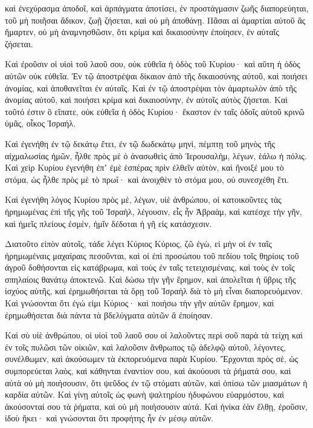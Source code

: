{καὶ ἐνεχύρασμα ἀποδοῖ, καὶ ἁρπάγματα ἀποτίσει, ἐν προστάγμασιν ζωῆς διαπορεύηται, τοῦ μὴ ποιῆσαι ἄδικον, ζωῇ ζήσεται, καὶ οὐ μὴ ἀποθάνῃ.
Πᾶσαι αἱ ἁμαρτίαι αὐτοῦ ἃς ἥμαρτεν, οὐ μὴ ἀναμνησθῶσιν, ὅτι κρίμα καὶ δικαιοσύνην ἐποίησεν, ἐν αὐταῖς ζήσεται.
\par }{\PP {}Καὶ ἐροῦσιν οἱ υἱοὶ τοῦ λαοῦ σου, οὐκ εὐθεῖα ἡ ὁδὸς τοῦ Κυρίου· καὶ αὕτη ἡ ὁδὸς αὐτῶν οὐκ εὐθεῖα.
Ἐν τῷ ἀποστρέψαι δίκαιον ἀπὸ τῆς δικαιοσύνης αὐτοῦ, καὶ ποιήσει ἀνομίας, καὶ ἀποθανεῖται ἐν αὐταῖς.
Καὶ ἐν τῷ ἀποστρέψαι τὸν ἁμαρτωλὸν ἀπὸ τῆς ἀνομίας αὐτοῦ, καὶ ποιήσει κρίμα καὶ δικαιοσύνην, ἐν αὐτοῖς αὐτὸς ζήσεται.
Καὶ τοῦτό ἐστιν ὃ εἴπατε, οὐκ εὐθεῖα ἡ ὁδὸς Κυρίου· ἕκαστον ἐν ταῖς ὁδοῖς αὐτοῦ κρινῶ ὑμᾶς, οἶκος Ἰσραήλ.
\par }{\PP {}Καὶ ἐγενήθη ἐν τῷ δεκάτῳ ἔτει, ἐν τῷ δωδεκάτῳ μηνὶ, πέμπτῃ τοῦ μηνὸς τῆς αἰχμαλωσίας ἡμῶν, ἦλθε πρὸς μὲ ὁ ἀνασωθεὶς ἀπὸ Ἱερουσαλὴμ, λέγων, ἑάλω ἡ πόλις.
Καὶ χεὶρ Κυρίου ἐγενήθη ἐπʼ ἐμὲ ἑσπέρας πρὶν ἐλθεῖν αὐτὸν, καὶ ἤνοιξέ μου τὸ στόμα, ὡς ἦλθε πρὸς μὲ τὸ πρωΐ· καὶ ἀνοιχθὲν τὸ στόμα μου, οὐ συνεσχέθη ἔτι.
\par }{\PP {}Καὶ ἐγενήθη λόγος Κυρίου πρὸς μὲ, λέγων,
υἱὲ ἀνθρώπου, οἱ κατοικοῦντες τὰς ἠρημωμένας ἐπὶ τῆς γῆς τοῦ Ἰσραὴλ, λέγουσιν, εἷς ἦν Ἁβραὰμ, καὶ κατέσχε τὴν γῆν, καὶ ἡμεῖς πλείους ἐσμὲν, ἡμῖν δέδοται ἡ γῆ εἰς κατάσχεσιν.
\par }{\PP {}Διατοῦτο εἰπὸν αὐτοῖς, τάδε λέγει Κύριος Κύριος,
ζῶ ἐγὼ, εἰ μὴν οἱ ἐν ταῖς ἠρημωμέναις μαχαίραις πεσοῦνται, καὶ οἱ ἐπὶ προσώπου τοῦ πεδίου τοῖς θηρίοις τοῦ ἀγροῦ δοθήσονται εἰς κατάβρωμα, καὶ τοὺς ἐν ταῖς τετειχισμέναις, καὶ τοὺς ἐν τοῖς σπηλαίοις θανάτῳ ἀποκτενῶ.
Καὶ δώσω τὴν γῆν ἔρημον, καὶ ἀπολεῖται ἡ ὕβρις τῆς ἰσχύος αὐτῆς, καὶ ἐρημωθήσεται τὰ ὄρῃ τοῦ Ἰσραὴλ διὰ τὸ μὴ εἶναι διαπορευόμενον.
Καὶ γνώσονται ὅτι ἐγώ εἰμι Κύριος· καὶ ποιήσω τὴν γῆν αὐτῶν ἔρημον, καὶ ἐρημωθήσεται διὰ πάντα τὰ βδελύγματα αὐτῶν ἃ ἐποίησαν.
\par }{\PP {}Καὶ σὺ υἱὲ ἀνθρώπου, οἱ υἱοὶ τοῦ λαοῦ σου οἱ λαλοῦντες περὶ σοῦ παρὰ τὰ τείχη καὶ ἐν τοῖς πυλῶσι τῶν οἰκιῶν, καὶ λαλοῦσιν ἄνθρωπος τῷ ἀδελφῷ αὐτοῦ, λέγοντες, συνέλθωμεν, καὶ ἀκούσωμεν τὰ ἐκπορευόμενα παρὰ Κυρίου.
Ἔρχονται πρὸς σὲ, ὡς συμπορεύεται λαὸς, καὶ κάθηνται ἐναντίον σου, καὶ ἀκούουσι τὰ ῥήματά σου, καὶ αὐτὰ οὐ μὴ ποιήσουσιν, ὅτι ψεῦδος ἐν τῷ στόματι αὐτῶν, καὶ ὀπίσω τῶν μιασμάτων ἡ καρδία αὐτῶν.
Καὶ γίνῃ αὐτοῖς ὡς φωνὴ ψαλτηρίου ἡδυφώνου εὐαρμόστου, καὶ ἀκούσονταί σου τὰ ῥήματα, καὶ οὐ μὴ ποιήσουσιν αὐτά.
Καὶ ἡνίκα ἐὰν ἔλθῃ, ἐροῦσιν, ἰδοὺ ἥκει· καὶ γνώσονται ὅτι προφήτης ἦν ἐν μέσῳ αὐτῶν.

}
